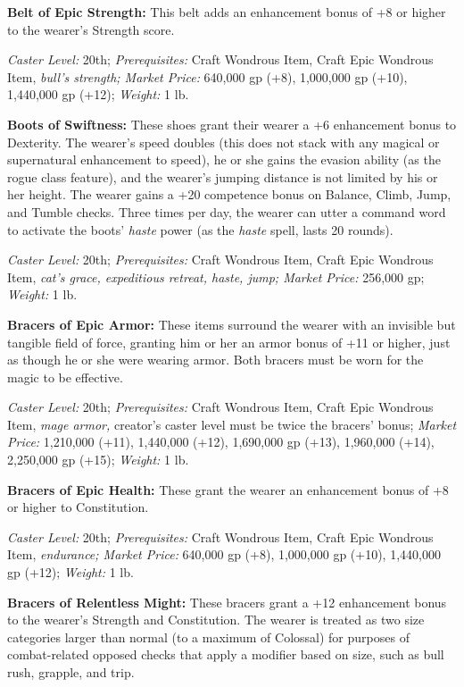 \documentclass{article}
\begin{document}
\textbf{Belt of Epic Strength: }This belt adds an enhancement bonus of +8 or higher 
to the wearer's Strength score. 

\textit{Caster Level: }20th; \textit{Prerequisites: }Craft Wondrous Item, Craft 
Epic Wondrous Item, \textit{bull's strength; Market Price: }640,000 gp (+8), 1,000,000 
gp (+10), 1,440,000 gp (+12); \textit{Weight: }1 lb. 

\textbf{Boots of Swiftness: }These shoes grant their wearer a +6 enhancement bonus 
to Dexterity. The wearer's speed doubles (this does not stack with any magical 
or supernatural enhancement to speed), he or she gains the evasion ability (as 
the rogue class feature), and the wearer's jumping distance is not limited by his 
or her height. The wearer gains a +20 competence bonus on Balance, Climb, Jump, 
and Tumble checks. Three times per day, the wearer can utter a command word to 
activate the boots' \textit{haste }power (as the \textit{haste }spell, lasts 20 
rounds). 

\textit{Caster Level: }20th; \textit{Prerequisites: }Craft Wondrous Item, Craft 
Epic Wondrous Item, \textit{cat's grace, expeditious retreat, haste, jump; Market 
Price: }256,000 gp; \textit{Weight: }1 lb. 

\textbf{Bracers of Epic Armor: }These items surround the wearer with an invisible 
but tangible field of force, granting him or her an armor bonus of +11 or higher, 
just as though he or she were wearing armor. Both bracers must be worn for the 
magic to be effective. 

\textit{Caster Level: }20th; \textit{Prerequisites: }Craft Wondrous Item, Craft 
Epic Wondrous Item, \textit{mage armor, }creator's caster level must be twice the 
bracers' bonus; \textit{Market Price: }1,210,000 (+11), 1,440,000 (+12), 1,690,000 
gp (+13), 1,960,000 (+14), 2,250,000 gp (+15); \textit{Weight: }1 lb. 

\textbf{Bracers of Epic Health: }These grant the wearer an enhancement bonus of 
+8 or higher to Constitution. 

\textit{Caster Level: }20th; \textit{Prerequisites: }Craft Wondrous Item, Craft 
Epic Wondrous Item, \textit{endurance; Market Price: }640,000 gp (+8), 1,000,000 
gp (+10), 1,440,000 gp (+12); \textit{Weight: }1 lb. 

\textbf{Bracers of Relentless Might: }These bracers grant a +12 enhancement bonus 
to the wearer's Strength and Constitution. The wearer is treated as two size categories 
larger than normal (to a maximum of Colossal) for purposes of combat-related opposed 
checks that apply a modifier based on size, such as bull rush, grapple, and trip. 
\end{document}

